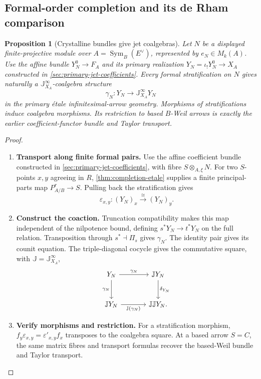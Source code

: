 \documentclass[11pt,a4paper]{article}
\numberwithin{algorithm}{section}
\numberwithin{equation}{section}
\newtheorem{proposition}[proposition]{Proposition}
\theoremstyle{definition}
\theoremstyle{remark}
\theoremstyle{plain}
\newcommand{\eps}{\varepsilon}
\newcommand{\Sym}{\operatorname{Sym}}
\theoremstyle{definition}
\theoremstyle{plain}
\begin{document}
\subsection{Formal-order completion and its de Rham comparison}
\label{sec:jet-derham-interface}
\begin{proposition}[Crystalline bundles give jet coalgebras]
\label{prop:crystalline-jet-coaction}
Let $N$ be a displayed finite-projective module over
$A=\Sym_B(E^\vee)$, represented by $e_N\in M_k(A)$.
Use the affine bundle $Y_N^0\to F_A$ and its primary realization
$Y_N=\iota_!Y_N^0\to X_A$ constructed in
\cref{sec:primary-jet-coefficients}.
Every formal stratification on $N$ gives naturally a
$\mathbb J_{X_A}^\infty$-coalgebra structure
\[
 \gamma_N:Y_N\longrightarrow\mathbb J_{X_A}^\infty Y_N
\]
in the primary \'etale infinitesimal-arrow geometry.
Morphisms of stratifications induce coalgebra morphisms.
Its restriction to based $B$-Weil arrows is exactly the earlier
coefficient-functor bundle and Taylor transport.
\end{proposition}
\begin{proof}\leavevmode
\begin{enumerate}[leftmargin=*,align=left]
\item \textbf{Transport along finite formal pairs.}
Use the affine coefficient bundle constructed in
\cref{sec:primary-jet-coefficients}, with fibre
$S\otimes_{A,\xi}N$. For two $S$-points $x,y$ agreeing in $R$,
\cref{thm:completion-etale} supplies a finite principal-parts
map $P^r_{A/B}\to S$. Pulling back the stratification gives
\[
 \eps_{x,y}:(Y_N)_x\xrightarrow{\cong}(Y_N)_y.
\]

\item \textbf{Construct the coaction.}
Truncation compatibility makes this map independent of the
nilpotence bound, defining $s^*Y_N\to t^*Y_N$ on the full
relation. Transposition through $s^*\dashv\Pi_s$ gives $\gamma_N$.
The identity pair gives its counit equation. The triple-diagonal
cocycle gives the commutative square, with
$\mathbb J=\mathbb J_{X_A}^\infty$,
\[
\begin{tikzcd}[column sep=large,row sep=large]
 Y_N \arrow[r,"{\gamma_N}"] \arrow[d,"{\gamma_N}"']
   & \mathbb JY_N \arrow[d,"{\delta_{Y_N}}"]\\
 \mathbb JY_N \arrow[r,"{\mathbb J(\gamma_N)}"']
   & \mathbb J\mathbb JY_N .
\end{tikzcd}
\]

\item \textbf{Verify morphisms and restriction.}
For a stratification morphism, $f_y\eps_{x,y}=\eps'_{x,y}f_x$
transposes to the coalgebra square. At a based arrow $S=C$,
the same matrix fibres and transport formulas recover the
based-Weil bundle and Taylor transport.
\end{enumerate}
\end{proof}
\end{document}
